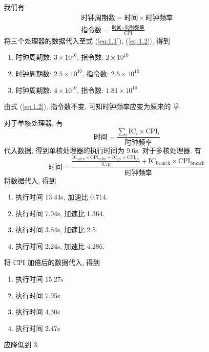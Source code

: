 \documentclass[11pt]{homework}
\begin{document}
\maketitle
\question
\begin{arabicparts}
    \questionpart
    我们有
    \begin{gather}
        \label{eq:1.1}\text{时钟周期数} = \text{时间}\times\text{时钟频率}\\
        \label{eq:1.2}\text{指令数} = \frac{\text{时间}\times\text{时钟频率}}{\text{CPI}}
    \end{gather}
    将三个处理器的数据代入至式 (\ref{eq:1.1}), (\ref{eq:1.2}), 得到
    \begin{enumerate}[label = P\arabic*]
        \item 时钟周期数: $3\times 10^{10}$, 指令数: $2\times 10^{10}$
        \item 时钟周期数: $2.5\times 10^{10}$, 指令数: $2.5\times 10^{10}$
        \item 时钟周期数: $4\times 10^{10}$, 指令数: $1.81\times 10^{10}$
    \end{enumerate}
    \questionpart
    由式 (\ref{eq:1.2}), 指令数不变, 可知时钟频率应变为原来的 $\displaystyle \frac{12}{7}$.
\end{arabicparts}
\question
\begin{arabicparts}
    \questionpart
    对于单核处理器, 有
    \begin{equation}
        \text{时间} = \frac{\displaystyle\sum_i\text{IC}_i\times \text{CPI}_i}{\text{时钟频率}} 
    \end{equation}
    代入数据, 得到单核处理器的执行时间为 9.6s.
    对于多核处理器, 有
    \begin{equation}
        \text{时间} = \frac{\displaystyle\frac{\text{IC}_{\text{arith}}\times \text{CPI}_{\text{arith}}+\text{IC}_{\text{l/s}}\times \text{CPI}_{\text{l/s}}}{0.7p}+\text{IC}_{\text{branch}}\times \text{CPI}_{\text{branch}}}{\text{时钟频率}} 
    \end{equation}
    将数据代入, 得到
    \begin{enumerate}[label = \arabic* 核]
        \item 执行时间 13.44s, 加速比 0.714. 
        \item 执行时间 7.04s, 加速比 1.364. 
        \item 执行时间 3.84s, 加速比 2.5. 
        \item 执行时间 2.24s, 加速比 4.286. 
    \end{enumerate}
    \questionpart
    将 CPI 加倍后的数据代入, 得到
    \begin{enumerate}[label = \arabic* 核]
        \item 执行时间 15.27s 
        \item 执行时间 7.95s
        \item 执行时间 4.30s
        \item 执行时间 2.47s
    \end{enumerate}
    \questionpart
    应降低到 3.
\end{arabicparts}
\end{document}
